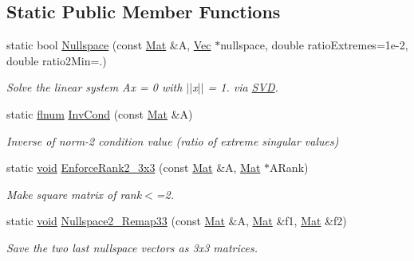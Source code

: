\subsection*{Static Public Member Functions}
\begin{DoxyCompactItemize}
\item 
static bool \hyperlink{classlibNumerics_1_1SVD_a77af43a6012f1e60696a51a892444c1b}{Nullspace} (const \hyperlink{classlibNumerics_1_1SVD_af7fa146726f27635a88ef053d5dbd4ab}{Mat} \&A, \hyperlink{classlibNumerics_1_1SVD_ad713d0bff81dcdd50acc63e285fb6c0d}{Vec} $\ast$nullspace, double ratio\+Extremes=1e-\/2, double ratio2\+Min=.)
\begin{DoxyCompactList}\small\item\em Solve the linear system Ax = 0 with $\vert$$\vert$x$\vert$$\vert$ = 1. via \hyperlink{classlibNumerics_1_1SVD}{S\+V\+D}. \end{DoxyCompactList}\item 
static \hyperlink{namespacelibNumerics_ac94c07350f743d00e3dbcb33b6e974b0}{flnum} \hyperlink{classlibNumerics_1_1SVD_aa2abf4ae159234d7282718080a419655}{Inv\+Cond} (const \hyperlink{classlibNumerics_1_1SVD_af7fa146726f27635a88ef053d5dbd4ab}{Mat} \&A)
\begin{DoxyCompactList}\small\item\em Inverse of norm-\/2 condition value (ratio of extreme singular values) \end{DoxyCompactList}\item 
static \hyperlink{png_8h_aa8c59027f9ab2769342f248709d68d17}{void} \hyperlink{classlibNumerics_1_1SVD_a4d9285dfb3d4118e2ce4a5cae22b4480}{Enforce\+Rank2\+\_\+3x3} (const \hyperlink{classlibNumerics_1_1SVD_af7fa146726f27635a88ef053d5dbd4ab}{Mat} \&A, \hyperlink{classlibNumerics_1_1SVD_af7fa146726f27635a88ef053d5dbd4ab}{Mat} $\ast$A\+Rank)
\begin{DoxyCompactList}\small\item\em Make square matrix of rank$<$=2. \end{DoxyCompactList}\item 
static \hyperlink{png_8h_aa8c59027f9ab2769342f248709d68d17}{void} \hyperlink{classlibNumerics_1_1SVD_a5945d8f411c51cbd8aef9f1ef94755b4}{Nullspace2\+\_\+\+Remap33} (const \hyperlink{classlibNumerics_1_1SVD_af7fa146726f27635a88ef053d5dbd4ab}{Mat} \&A, \hyperlink{classlibNumerics_1_1SVD_af7fa146726f27635a88ef053d5dbd4ab}{Mat} \&f1, \hyperlink{classlibNumerics_1_1SVD_af7fa146726f27635a88ef053d5dbd4ab}{Mat} \&f2)
\begin{DoxyCompactList}\small\item\em Save the two last nullspace vectors as 3x3 matrices. \end{DoxyCompactList}\item 

\end{DoxyCompactItemize}
